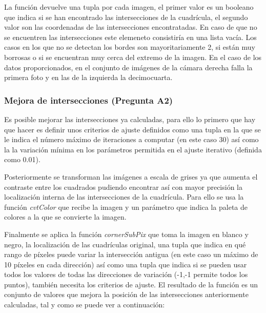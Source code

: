 \documentclass[a4paper,12pt]{article}
\begin{document}
{La función devuelve una tupla por cada imagen, el primer valor es un booleano que indica si se han encontrado las intersecciones de la cuadrícula, el segundo valor son las coordenadas de las intersecciones encontratadas. En caso de que no se encuentren las intersecciones este elemeneto consistiría en una lista vacía. Los casos en los que no se detectan los bordes son mayoritariamente 2, si están muy borrosas o si se encuentran muy cerca del extremo de la imagen. En el caso de los datos proporcionados, en el conjunto de imágenes de la cámara derecha falla la primera foto y en las de la izquierda la decimocuarta.

\vspace{0.5cm}

\subsubsection{Mejora de intersecciones (Pregunta A2)}

Es posible mejorar las intersecciones ya calculadas, para ello lo primero que hay que hacer es definir unos criterios de ajuste definidos como una tupla en la que se le indica el número máximo de iteraciones a computar (en este caso 30) así como la la variación mínima en los parámetros permitida en el ajuste iterativo (definida como 0.01).

\vspace{0.5cm}

Posteriormente se transforman las imágenes a escala de grises ya que aumenta el contraste entre los cuadrados pudiendo encontrar así con mayor precisión la localización interna de las intersecciones de la cuadrícula. Para ello se usa la función \textit{cvtColor} que recibe la imagen y un parámetro que indica la paleta de colores a la que se convierte la imagen.

\vspace{0.5cm}

Finalmente se aplica la función \textit{cornerSubPix} que toma la imagen en blanco y negro, la localización de las cuadrículas original, una tupla que indica en qué rango de píxeles puede variar la intersección antigua (en este caso un máximo de 10 píxeles en cada dirección) así como una tupla que indica si se pueden usar todos los valores de todas las direcciones de variación (-1,-1 permite todos los puntos), también necesita los criterios de ajuste. El resultado de la función es un conjunto de valores que mejora la posición de las intersecciones anteriormente calculadas, tal y como se puede ver a continuación:

}
\end{document}
